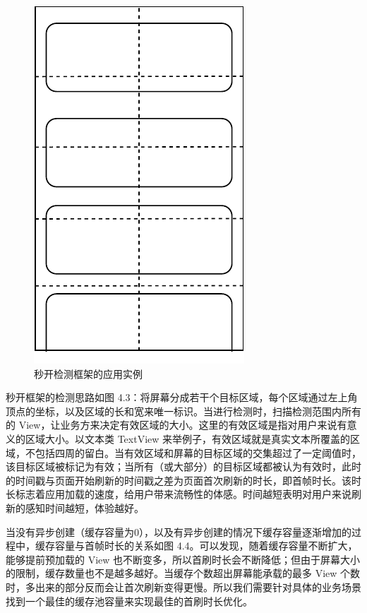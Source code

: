 \begin{figure}[H]
    \centering
    \includegraphics{assets/visibility-check.pdf}
    \caption{秒开检测框架的应用实例}
\end{figure}

秒开框架的检测思路如图 4.3：将屏幕分成若干个目标区域，每个区域通过左上角顶点的坐标，以及区域的长和宽来唯一标识。当进行检测时，扫描检测范围内所有的 View，让业务方来决定有效区域的大小。这里的有效区域是指对用户来说有意义的区域大小。以文本类 TextView 来举例子，有效区域就是真实文本所覆盖的区域，不包括四周的留白。当有效区域和屏幕的目标区域的交集超过了一定阈值时，该目标区域被标记为有效；当所有（或大部分）的目标区域都被认为有效时，此时的时间戳与页面开始刷新的时间戳之差为页面首次刷新的时长，即首帧时长。该时长标志着应用加载的速度，给用户带来流畅性的体感。时间越短表明对用户来说刷新的感知时间越短，体验越好。



当没有异步创建（缓存容量为0），以及有异步创建的情况下缓存容量逐渐增加的过程中，缓存容量与首帧时长的关系如图 4.4。可以发现，随着缓存容量不断扩大，能够提前预加载的 View 也不断变多，所以首刷时长会不断降低；但由于屏幕大小的限制，缓存数量也不是越多越好。当缓存个数超出屏幕能承载的最多 View 个数时，多出来的部分反而会让首次刷新变得更慢。所以我们需要针对具体的业务场景找到一个最佳的缓存池容量来实现最佳的首刷时长优化。